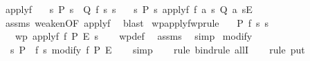 \begin{isabellebody}
%
\endisadelimproof
\isanewline
{}\isamarkupfalse%
\ applyf{\isacharprime}{\kern0pt}{\isacharcolon}{\kern0pt}\isanewline
\ \ \ {\isachardoublequoteopen}{\isasymforall}s{\isachardot}{\kern0pt}\ P\ s\ {\isasymlongrightarrow}\ Q\ {\isacharparenleft}{\kern0pt}f\ s{\isacharparenright}{\kern0pt}\ s{\isachardoublequoteclose}\isanewline
\ \ \ {\isachardoublequoteopen}{\isasymlbrace}{\isasymlambda}s{\isachardot}{\kern0pt}\ P\ s{\isasymrbrace}\ applyf\ f\ {\isasymlbrace}{\isasymlambda}a\ s{\isachardot}{\kern0pt}\ Q\ a\ s{\isasymrbrace}{\isacharcomma}{\kern0pt}{\isasymlbrace}E{\isasymrbrace}{\isachardoublequoteclose}\isanewline
%
\isadelimproof
\ \ %
\endisadelimproof
%
\isatagproof
{}\isamarkupfalse%
\ assms\ weaken{\isacharbrackleft}{\kern0pt}OF\ applyf{\isacharbrackright}{\kern0pt}\ \isamarkupfalse%
\ blast%
\endisatagproof
{\isafoldproof}%
%
\isadelimproof
\isanewline
%
\endisadelimproof
\isanewline
{}\isamarkupfalse%
\ wpapplyf{\isacharbrackleft}{\kern0pt}wprule{\isacharbrackright}{\kern0pt}{\isacharcolon}{\kern0pt}\isanewline
\ \ \ {\isachardoublequoteopen}P\ {\isacharparenleft}{\kern0pt}f\ s{\isacharparenright}{\kern0pt}\ s{\isachardoublequoteclose}\isanewline
\ \ \ {\isachardoublequoteopen}wp\ {\isacharparenleft}{\kern0pt}applyf\ f{\isacharparenright}{\kern0pt}\ P\ E\ s{\isachardoublequoteclose}\isanewline
%
\isadelimproof
\ \ %
\endisadelimproof
%
\isatagproof
{}\isamarkupfalse%
\ wp{\isacharunderscore}{\kern0pt}def\ \isamarkupfalse%
\ assms\ \isamarkupfalse%
\ simp%
\endisatagproof
{\isafoldproof}%
%
\isadelimproof
\isanewline
%
\endisadelimproof
\isanewline
{}\isamarkupfalse%
\ modify{\isacharcolon}{\kern0pt}\isanewline
\ \ {\isachardoublequoteopen}{\isasymlbrace}{\isasymlambda}s{\isachardot}{\kern0pt}\ P\ {\isacharparenleft}{\kern0pt}{\isacharparenright}{\kern0pt}\ {\isacharparenleft}{\kern0pt}f\ s{\isacharparenright}{\kern0pt}{\isasymrbrace}\ modify\ f\ {\isasymlbrace}P{\isasymrbrace}{\isacharcomma}{\kern0pt}\ {\isasymlbrace}E{\isasymrbrace}{\isachardoublequoteclose}\isanewline
%
\isadelimproof
\ \ %
\endisadelimproof
%
\isatagproof
{}\isamarkupfalse%
\ simp\isanewline
\ \ \isamarkupfalse%
\ {\isacharparenleft}{\kern0pt}rule\ bind{\isacharcomma}{\kern0pt}rule\ allI{\isacharparenright}{\kern0pt}\isanewline
\ \ \isamarkupfalse%
\ {\isacharparenleft}{\kern0pt}rule\ put{\isacharparenright}{\kern0pt}\isanewline

\end{isabellebody}
